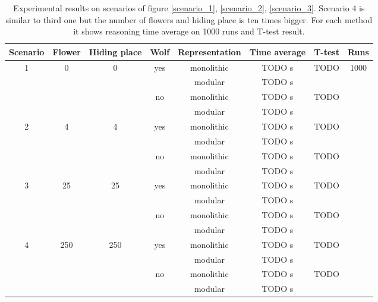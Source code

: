 \documentclass{aamas2012}
\begin{document}
	\begin{table}
		\label{Experiment_tab}
		\centering
		\begin{tabular}{ | c | c | c | c | c | c | c | c | }
		\hline
		Scenario & Flower & Hiding place & Wolf & Representation & Time average & T-test & Runs\\	
		\hline
	 	\multirow{4}{*}{1} & \multirow{4}{*}{0} & \multirow{4}{*}{0} & \multirow{2}{*}{yes} & monolithic & TODO s & \multirow{2}{*}{TODO} & \multirow{16}{*}{1000} \\
		& & & & modular & TODO s & & \\ \cline{4-7}
		& & & \multirow{2}{*}{no} & monolithic & TODO s & \multirow{2}{*}{TODO} & \\
		& & & & modular & TODO s & & \\ \cline{1-7}
		\multirow{4}{*}{2} & \multirow{4}{*}{4} & \multirow{4}{*}{4} & \multirow{2}{*}{yes} & monolithic & TODO s & \multirow{2}{*}{TODO} & \\
		& & & & modular & TODO s & & \\ \cline{4-7}
		& & & \multirow{2}{*}{no} & monolithic & TODO s & \multirow{2}{*}{TODO} & \\
		& & & & modular & TODO s & & \\ \cline{1-7}
		\multirow{4}{*}{3} & \multirow{4}{*}{25} & \multirow{4}{*}{25} & \multirow{2}{*}{yes} & monolithic & TODO s & \multirow{2}{*}{TODO} & \\
		& & & & modular & TODO s & & \\ \cline{4-7}
		& & & \multirow{2}{*}{no} & monolithic & TODO s & \multirow{2}{*}{TODO} & \\
		& & & & modular & TODO s & & \\ \cline{1-7}
		\multirow{4}{*}{4} & \multirow{4}{*}{250} & \multirow{4}{*}{250} & \multirow{2}{*}{yes} & monolithic & TODO s & \multirow{2}{*}{TODO} & \\
		& & & & modular & TODO s & & \\ \cline{4-7}
		& & &  \multirow{2}{*}{no} & monolithic & TODO s & \multirow{2}{*}{TODO} & \\
		& & & & modular & TODO s & & \\ \cline{1-7}
		\hline
		\end{tabular}
		\caption
		{
			Experimental results on scenarios of figure \ref{scenario_1}, \ref{scenario_2}, \ref{scenario_3}.
			Scenario 4 is similar to third one but the number of flowers and hiding place is ten times bigger.
			For each method it shows reasoning time average on 1000 runs and T-test result.
		}
	\end{table}
	
\end{document}
